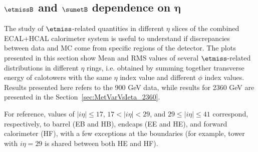 \clearpage

\subsection[$\etmiss$ and $\sumet$ dependence on $\eta$]{$\etmissB$ and $\sumetB$ dependence on $\boldsymbol{\eta}$} \label{sec:MetVarVsIeta_900}

The study of $\etmiss$-related quantities in different $\eta$
slices of the combined ECAL+HCAL calorimeter system 
is useful to understand if discrepancies between data and MC 
come from specific regions of the detector.
The plots presented in this section show Mean and RMS values 
of several $\etmiss$-related distributions in different 
$\eta$ rings, i.e. obtained by summing together 
transverse energy of calotowers with the same 
$\eta$ index value and different $\phi$ index values.
Results presented here refers to the 900 GeV data, while results for 2360 GeV
are presented in the Section~\ref{sec:MetVarVsIeta_2360}.

For reference, values of $|i\eta|\le17$, $17<|i\eta|<29$, and $29\le|i\eta|\le41$ 
correspond, respectively, to barrel (EB and HB), endcaps (EE and HE), and forward 
calorimeter (HF), with a few exceptions at the boundaries 
(for example, tower with $i\eta=29$ is shared between both HE and HF).

